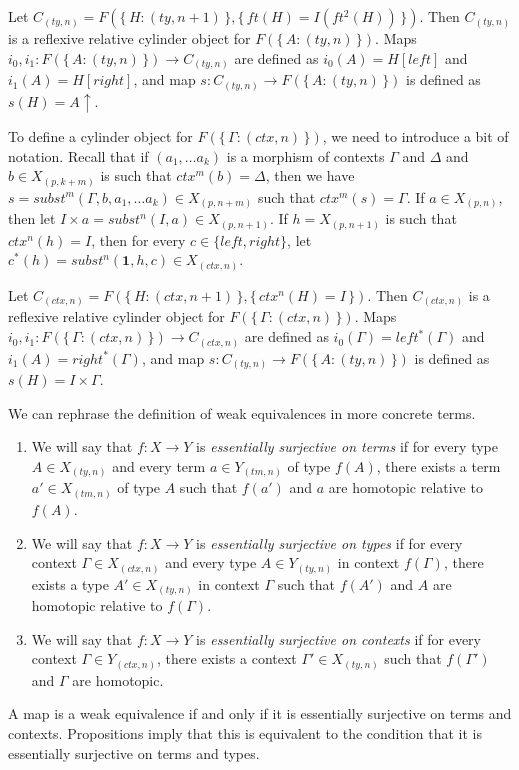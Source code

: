 \documentclass[reqno]{amsart}
\theoremstyle{definition}
\theoremstyle{remark}
\newcommand{\emptyCtx}{\mathbf{1}}
\newcommand{\cyli}{i}
\numberwithin{figure}{section}
\begin{document}
Let $C_{(ty,n)} = F(\{\,H : (ty,n+1)\,\}, \{\,ft(H) = I(ft^2(H))\,\})$.
Then $C_{(ty,n)}$ is a reflexive relative cylinder object for $F(\{\,A : (ty,n)\,\})$.
Maps $\cyli_0, \cyli_1 : F(\{\,A : (ty,n)\,\}) \to C_{(ty,n)}$ are defined as $\cyli_0(A) = H[left]$ and $\cyli_1(A) = H[right]$,
and map $s : C_{(ty,n)} \to F(\{\,A : (ty,n)\,\})$ is defined as $s(H) = A\!\!\uparrow$.

To define a cylinder object for $F(\{\,\Gamma : (ctx,n)\,\})$, we need to introduce a bit of notation.
Recall that if $(a_1, \ldots a_k)$ is a morphism of contexts $\Gamma$ and $\Delta$ and $b \in X_{(p,k+m)}$ is such that $ctx^m(b) = \Delta$,
then we have $s = subst^m(\Gamma, b, a_1, \ldots a_k) \in X_{(p,n+m)}$ such that $ctx^m(s) = \Gamma$.
If $a \in X_{(p,n)}$, then let $I \times a = subst^n(I, a) \in X_{(p,n+1)}$.
If $h = X_{(p,n+1)}$ is such that $ctx^n(h) = I$, then for every $c \in \{ left, right \}$, let $c^*(h) = subst^n(\emptyCtx, h, c) \in X_{(ctx,n)}$.

Let $C_{(ctx,n)} = F(\{\,H : (ctx,n+1)\,\}, \{\,ctx^n(H) = I\,\})$.
Then $C_{(ctx,n)}$ is a reflexive relative cylinder object for $F(\{\,\Gamma : (ctx,n)\,\})$.
Maps $\cyli_0, \cyli_1 : F(\{\,\Gamma : (ctx,n)\,\}) \to C_{(ctx,n)}$ are defined as $\cyli_0(\Gamma) = left^*(\Gamma)$ and $\cyli_1(A) = right^*(\Gamma)$,
and map $s : C_{(ty,n)} \to F(\{\,A : (ty,n)\,\})$ is defined as $s(H) = I \times \Gamma$.

We can rephrase the definition of weak equivalences in more concrete terms.
\begin{enumerate}
\item We will say that $f : X \to Y$ is \emph{essentially surjective on terms} if
for every type $A \in X_{(ty,n)}$ and every term $a \in Y_{(tm,n)}$ of type $f(A)$,
there exists a term $a' \in X_{(tm,n)}$ of type $A$ such that $f(a')$ and $a$ are homotopic relative to $f(A)$.
\item We will say that $f : X \to Y$ is \emph{essentially surjective on types} if
for every context $\Gamma \in X_{(ctx,n)}$ and every type $A \in Y_{(ty,n)}$ in context $f(\Gamma)$,
there exists a type $A' \in X_{(ty,n)}$ in context $\Gamma$ such that $f(A')$ and $A$ are homotopic relative to $f(\Gamma)$.
\item We will say that $f : X \to Y$ is \emph{essentially surjective on contexts} if
for every context $\Gamma \in Y_{(ctx,n)}$, there exists a context $\Gamma' \in X_{(ty,n)}$ such that $f(\Gamma')$ and $\Gamma$ are homotopic.
\end{enumerate}
A map is a weak equivalence if and only if it is essentially surjective on terms and contexts.
Propositions  imply that this is equivalent to the condition that it is essentially surjective on terms and types.
\end{document}
